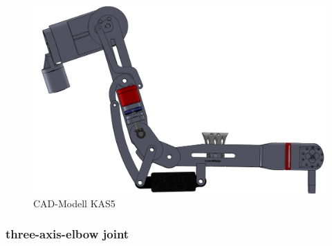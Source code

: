 \documentclass[letterpaper, 10 pt, conference]{ieeeconf}  %
\begin{document}
\begin{figure}[tb!]
    \includegraphics[width=\linewidth]{figures/KAS5_Seitenansicht_CAD_Ausschnitt_transp.png}
    \caption{CAD-Modell KAS5}
    \label{fig:KAS5_CAD}
\end{figure} 

\subsubsection{three-axis-elbow joint}
\end{document}
